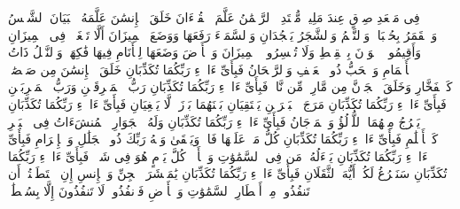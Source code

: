 \startbuffer[\q:54:55]
فِی مَقۡعَدِ صِدۡقٍ عِندَ مَلِیكࣲ مُّقۡتَدِرِۭ%
\stopbuffer
\startbuffer[\q:55:1]
ٱلرَّحۡمَٰنُ%
\stopbuffer
\startbuffer[\q:55:2]
عَلَّمَ ٱلۡقُرۡءَانَ%
\stopbuffer
\startbuffer[\q:55:3]
خَلَقَ ٱلۡإِنسَٰنَ%
\stopbuffer
\startbuffer[\q:55:4]
عَلَّمَهُ ٱلۡبَیَانَ%
\stopbuffer
\startbuffer[\q:55:5]
ٱلشَّمۡسُ وَٱلۡقَمَرُ بِحُسۡبَانࣲ%
\stopbuffer
\startbuffer[\q:55:6]
وَٱلنَّجۡمُ وَٱلشَّجَرُ یَسۡجُدَانِ%
\stopbuffer
\startbuffer[\q:55:7]
وَٱلسَّمَاۤءَ رَفَعَهَا وَوَضَعَ ٱلۡمِیزَانَ%
\stopbuffer
\startbuffer[\q:55:8]
أَلَّا تَطۡغَوۡا۟ فِی ٱلۡمِیزَانِ%
\stopbuffer
\startbuffer[\q:55:9]
وَأَقِیمُوا۟ ٱلۡوَزۡنَ بِٱلۡقِسۡطِ وَلَا تُخۡسِرُوا۟ ٱلۡمِیزَانَ%
\stopbuffer
\startbuffer[\q:55:10]
وَٱلۡأَرۡضَ وَضَعَهَا لِلۡأَنَامِ%
\stopbuffer
\startbuffer[\q:55:11]
فِیهَا فَٰكِهَةࣱ وَٱلنَّخۡلُ ذَاتُ ٱلۡأَكۡمَامِ%
\stopbuffer
\startbuffer[\q:55:12]
وَٱلۡحَبُّ ذُو ٱلۡعَصۡفِ وَٱلرَّیۡحَانُ%
\stopbuffer
\startbuffer[\q:55:13]
فَبِأَیِّ ءَالَاۤءِ رَبِّكُمَا تُكَذِّبَانِ%
\stopbuffer
\startbuffer[\q:55:14]
خَلَقَ ٱلۡإِنسَٰنَ مِن صَلۡصَٰلࣲ كَٱلۡفَخَّارِ%
\stopbuffer
\startbuffer[\q:55:15]
وَخَلَقَ ٱلۡجَاۤنَّ مِن مَّارِجࣲ مِّن نَّارࣲ%
\stopbuffer
\startbuffer[\q:55:16]
فَبِأَیِّ ءَالَاۤءِ رَبِّكُمَا تُكَذِّبَانِ%
\stopbuffer
\startbuffer[\q:55:17]
رَبُّ ٱلۡمَشۡرِقَیۡنِ وَرَبُّ ٱلۡمَغۡرِبَیۡنِ%
\stopbuffer
\startbuffer[\q:55:18]
فَبِأَیِّ ءَالَاۤءِ رَبِّكُمَا تُكَذِّبَانِ%
\stopbuffer
\startbuffer[\q:55:19]
مَرَجَ ٱلۡبَحۡرَیۡنِ یَلۡتَقِیَانِ%
\stopbuffer
\startbuffer[\q:55:20]
بَیۡنَهُمَا بَرۡزَخࣱ لَّا یَبۡغِیَانِ%
\stopbuffer
\startbuffer[\q:55:21]
فَبِأَیِّ ءَالَاۤءِ رَبِّكُمَا تُكَذِّبَانِ%
\stopbuffer
\startbuffer[\q:55:22]
یَخۡرُجُ مِنۡهُمَا ٱللُّؤۡلُؤُ وَٱلۡمَرۡجَانُ%
\stopbuffer
\startbuffer[\q:55:23]
فَبِأَیِّ ءَالَاۤءِ رَبِّكُمَا تُكَذِّبَانِ%
\stopbuffer
\startbuffer[\q:55:24]
وَلَهُ ٱلۡجَوَارِ ٱلۡمُنشَءَاتُ فِی ٱلۡبَحۡرِ كَٱلۡأَعۡلَٰمِ%
\stopbuffer
\startbuffer[\q:55:25]
فَبِأَیِّ ءَالَاۤءِ رَبِّكُمَا تُكَذِّبَانِ%
\stopbuffer
\startbuffer[\q:55:26]
كُلُّ مَنۡ عَلَیۡهَا فَانࣲ%
\stopbuffer
\startbuffer[\q:55:27]
وَیَبۡقَىٰ وَجۡهُ رَبِّكَ ذُو ٱلۡجَلَٰلِ وَٱلۡإِكۡرَامِ%
\stopbuffer
\startbuffer[\q:55:28]
فَبِأَیِّ ءَالَاۤءِ رَبِّكُمَا تُكَذِّبَانِ%
\stopbuffer
\startbuffer[\q:55:29]
یَسۡءَلُهُۥ مَن فِی ٱلسَّمَٰوَٰتِ وَٱلۡأَرۡضِۚ كُلَّ یَوۡمٍ هُوَ فِی شَأۡنࣲ%
\stopbuffer
\startbuffer[\q:55:30]
فَبِأَیِّ ءَالَاۤءِ رَبِّكُمَا تُكَذِّبَانِ%
\stopbuffer
\startbuffer[\q:55:31]
سَنَفۡرُغُ لَكُمۡ أَیُّهَ ٱلثَّقَلَانِ%
\stopbuffer
\startbuffer[\q:55:32]
فَبِأَیِّ ءَالَاۤءِ رَبِّكُمَا تُكَذِّبَانِ%
\stopbuffer
\startbuffer[\q:55:33]
یَٰمَعۡشَرَ ٱلۡجِنِّ وَٱلۡإِنسِ إِنِ ٱسۡتَطَعۡتُمۡ أَن تَنفُذُوا۟ مِنۡ أَقۡطَارِ ٱلسَّمَٰوَٰتِ وَٱلۡأَرۡضِ فَٱنفُذُوا۟ۚ لَا تَنفُذُونَ إِلَّا بِسُلۡطَٰنࣲ%

